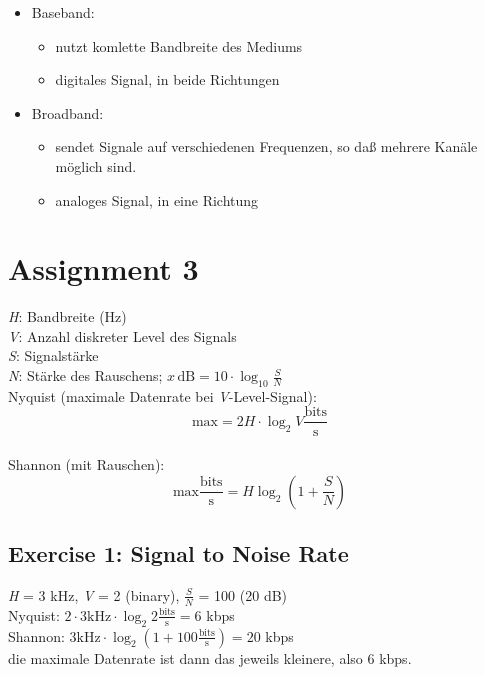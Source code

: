 \documentclass[10pt,a4paper]{scrartcl}
\begin{document}
\begin{itemize}
\item Baseband:
\begin{itemize}
\item nutzt komlette Bandbreite des Mediums
\item digitales Signal, in beide Richtungen
\end{itemize}
\item Broadband:
\begin{itemize}
\item sendet Signale auf verschiedenen Frequenzen, so daß mehrere Kanäle möglich sind.
\item analoges Signal, in eine Richtung
\end{itemize}
\end{itemize}


\section*{Assignment 3}
\textit{H}: Bandbreite (Hz)\\
\textit{V}: Anzahl diskreter Level des Signals\\
\textit{S}: Signalstärke\\
\textit{N}: Stärke des Rauschens; $ x \, \mathrm{ dB} = 10 \cdot \log_10 \frac{S}{N} $\\

Nyquist (maximale Datenrate bei \textit{V}-Level-Signal): \[  \mathrm{max} = 2H \cdot \log_2{V} \frac{\mathrm{bits}}{\mathrm{s}} \]\\

Shannon (mit Rauschen): \[ \mathrm{max} \frac{\mathrm{bits}}{\mathrm{s}} = H \log_2{(1+\frac{S}{N})} \]

\subsection*{Exercise 1: Signal to Noise Rate}

\textit{H} = 3 kHz, \textit{V} = 2 (binary), $\frac{S}{N}$ = 100 (20 dB)\\

Nyquist: $ 2 \cdot 3 \mathrm{kHz} \cdot \log_2{2} \frac{\mathrm{bits}}{\mathrm{s}} = 6$ kbps\\

Shannon: $ 3 \mathrm{kHz} \cdot \log_2{(1+100\frac{\mathrm{bits}}{\mathrm{s}})} = 20$ kbps\\

die maximale Datenrate ist dann das jeweils kleinere, also 6 kbps.
\end{document}
